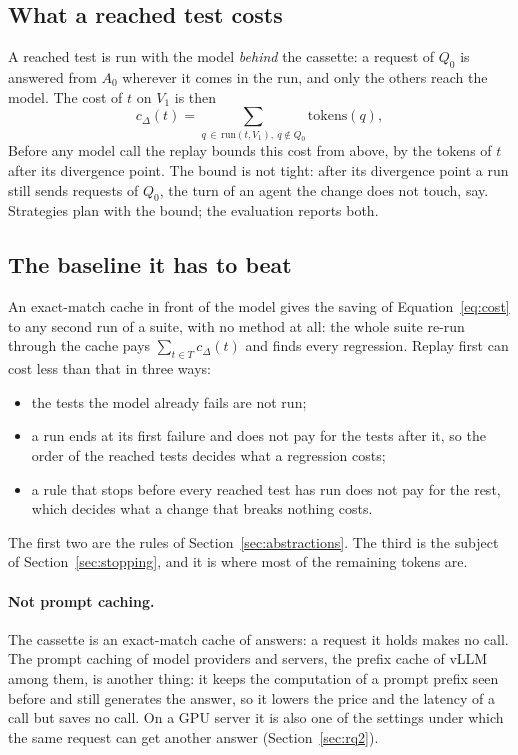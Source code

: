 \documentclass[11pt,a4paper]{article}
\begin{document}
\subsection{What a reached test costs}

A reached test is run with the model \emph{behind} the cassette: a request of $Q_0$ is answered from $A_0$
wherever it comes in the run, and only the others reach the model. The cost of $t$ on $V_1$ is then
\begin{equation}
  c_\Delta(t) = \sum_{q \,\in\, \mathrm{run}(t, V_1),\ q \notin Q_0} \mathrm{tokens}(q),
  \label{eq:cost}
\end{equation}
Before any model call the replay bounds this cost from above, by the tokens of $t$ after its divergence point. The
bound is not tight: after its divergence point a run still sends requests of $Q_0$, the turn of an agent the
change does not touch, say. Strategies plan with the bound; the evaluation reports both.

\subsection{The baseline it has to beat}

An exact-match cache in front of the model gives the saving of Equation~\ref{eq:cost} to any second run of a
suite, with no method at all: the whole suite re-run through the cache pays $\sum_{t \in T} c_\Delta(t)$ and finds
every regression. Replay first can cost less than that in three ways:
\begin{itemize}
  \item the tests the model already fails are not run;
  \item a run ends at its first failure and does not pay for the tests after it, so the order of the reached
        tests decides what a regression costs;
  \item a rule that stops before every reached test has run does not pay for the rest, which decides what a
        change that breaks nothing costs.
\end{itemize}
The first two are the rules of Section~\ref{sec:abstractions}. The third is the subject of
Section~\ref{sec:stopping}, and it is where most of the remaining tokens are.

\paragraph{Not prompt caching.} The cassette is an exact-match cache of answers: a request it holds makes no call.
The prompt caching of model providers and servers, the prefix cache of vLLM among them, is another thing: it keeps
the computation of a prompt prefix seen before and still generates the answer, so it lowers the price and the
latency of a call but saves no call. On a GPU server it is also one of the settings under which the same request
can get another answer (Section~\ref{sec:rq2}).
\end{document}
